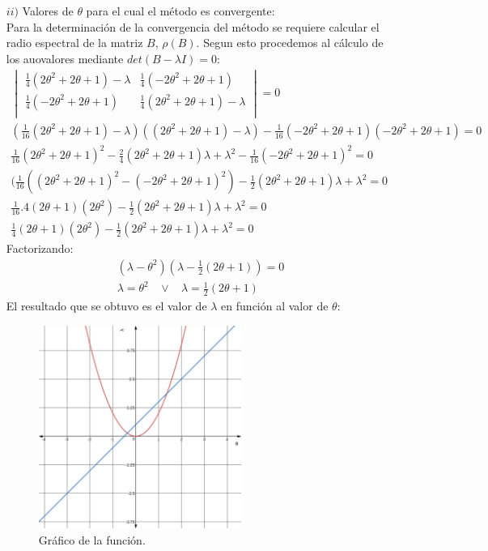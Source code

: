 \begin{itemize}
\item [$ii)$]  Valores de $\theta$ para el cual el método es convergente:\\

Para la determinación de la convergencia del método se requiere calcular el radio espectral de la matriz $B$, $\rho(B)$.  Segun esto procedemos al cálculo de los auovalores mediante $det(B - \lambda I) = 0$:\\
\begin{gather*}
\begin{vmatrix}
       \frac{1}{4}(2\theta^2 + 2\theta + 1) - \lambda  &     \frac{1}{4}(-2\theta^2 + 2\theta + 1) \\
       \frac{1}{4}(-2\theta^2 + 2\theta + 1)   &     \frac{1}{4}(2\theta^2 + 2\theta + 1)  - \lambda \\ 
\end{vmatrix} = 0\\
    (\frac{1}{16}(2\theta^2 + 2\theta + 1) - \lambda)((2\theta^2 + 2\theta + 1)  - \lambda) - \frac{1}{16}(-2\theta^2 + 2\theta + 1)(-2\theta^2 + 2\theta + 1) = 0\\
    \frac{1}{16}(2\theta^2 + 2\theta + 1)^2 - \frac{2}{4}(2\theta^2 + 2\theta + 1)\lambda +  \lambda^2 - \frac{1}{16}(-2\theta^2 + 2\theta + 1)^2 = 0\\
    (\frac{1}{16}((2\theta^2+2\theta + 1)^2 - (-2\theta^2+2\theta + 1)^2) - \frac{1}{2}(2\theta^2 + 2\theta + 1)\lambda +  \lambda^2 = 0\\
    \frac{1}{16}.4(2\theta + 1)(2\theta^2) - \frac{1}{2}(2\theta^2 + 2\theta + 1)\lambda +  \lambda^2 = 0\\
    \frac{1}{4}(2\theta + 1)(2\theta^2) - \frac{1}{2}(2\theta^2 + 2\theta + 1)\lambda +  \lambda^2 = 0
\end{gather*}
Factorizando:
\begin{gather*}
    (\lambda - \theta^2)(\lambda - \frac{1}{2}(2\theta + 1)) = 0\\
    \lambda = \theta^2\>\>\>\> \vee \>\>\>\> \lambda = \frac{1}{2}(2\theta + 1)
\end{gather*}
El resultado que se obtuvo es el valor de $\lambda$ en función al valor de $\theta$:
\begin{figure}[H]
  \centering
  \includegraphics[width=250px]{images/graph_q5.png}
  \caption{Gr\'afico de la función.}
  \label{fig:graph5}
\end{figure}


\end{itemize}
